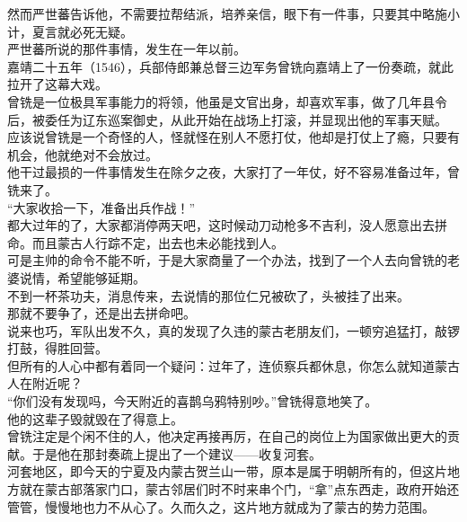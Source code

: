\begin{multicols}{\theparacolNo}
然而严世蕃告诉他，不需要拉帮结派，培养亲信，眼下有一件事，只要其中略施小计，夏言就必死无疑。\\

严世蕃所说的那件事情，发生在一年以前。\\

嘉靖二十五年（1546），兵部侍郎兼总督三边军务曾铣向嘉靖上了一份奏疏，就此拉开了这幕大戏。\\

曾铣是一位极具军事能力的将领，他虽是文官出身，却喜欢军事，做了几年县令后，被委任为辽东巡案御史，从此开始在战场上打滚，并显现出他的军事天赋。\\

应该说曾铣是一个奇怪的人，怪就怪在别人不愿打仗，他却是打仗上了瘾，只要有机会，他就绝对不会放过。\\

他干过最损的一件事情发生在除夕之夜，大家打了一年仗，好不容易准备过年，曾铣来了。\\

“大家收拾一下，准备出兵作战！”\\

都大过年的了，大家都消停两天吧，这时候动刀动枪多不吉利，没人愿意出去拼命。而且蒙古人行踪不定，出去也未必能找到人。\\

可是主帅的命令不能不听，于是大家商量了一个办法，找到了一个人去向曾铣的老婆说情，希望能够延期。\\

不到一杯茶功夫，消息传来，去说情的那位仁兄被砍了，头被挂了出来。\\

那就不要争了，还是出去拼命吧。\\

说来也巧，军队出发不久，真的发现了久违的蒙古老朋友们，一顿穷追猛打，敲锣打鼓，得胜回营。\\

但所有的人心中都有着同一个疑问：过年了，连侦察兵都休息，你怎么就知道蒙古人在附近呢？\\

“你们没有发现吗，今天附近的喜鹊乌鸦特别吵。”曾铣得意地笑了。\\

他的这辈子毁就毁在了得意上。\\

曾铣注定是个闲不住的人，他决定再接再厉，在自己的岗位上为国家做出更大的贡献。于是他在那封奏疏上提出了一个建议——收复河套。\\

河套地区，即今天的宁夏及内蒙古贺兰山一带，原本是属于明朝所有的，但这片地方就在蒙古部落家门口，蒙古邻居们时不时来串个门，“拿”点东西走，政府开始还管管，慢慢地也力不从心了。久而久之，这片地方就成为了蒙古的势力范围。\\


\end{multicols}
